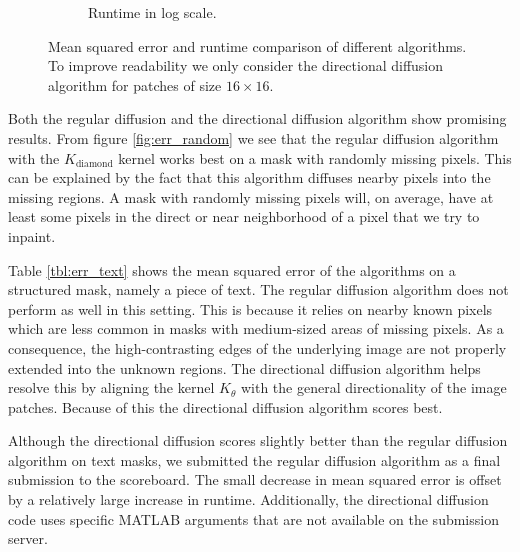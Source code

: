 \begin{figure}
\begin{subfigure}[b]{0.49\textwidth}
		\caption{Runtime in log scale.}
		\label{fig:runtime}
	\end{subfigure}
	
	\caption{Mean squared error and runtime comparison of different algorithms. To improve readability we only consider the directional diffusion algorithm for patches of size $16 \times 16$.}
	\label{fig:rmd_results}
\end{figure}


Both the regular diffusion and the directional diffusion algorithm show promising results. From figure \ref{fig:err_random} we see that the regular diffusion algorithm with the $K_{\text{diamond}}$ kernel works best on a mask with randomly missing pixels. This can be explained by the fact that this algorithm diffuses nearby pixels into the missing regions. A mask with randomly missing pixels will, on average, have at least some pixels in the direct or near neighborhood of a pixel that we try to inpaint.

Table \ref{tbl:err_text} shows the mean squared error of the algorithms on a structured mask, namely a piece of text. The regular diffusion algorithm does not perform as well in this setting. This is because it relies on nearby known pixels which are less common in masks with medium-sized areas of missing pixels. As a consequence, the high-contrasting edges of the underlying image are not properly extended into the unknown regions. The directional diffusion algorithm helps resolve this by aligning the kernel  $K_{\theta}$ with the general directionality of the image patches. Because of this the directional diffusion algorithm scores best.

Although the directional diffusion scores slightly better than the regular diffusion algorithm on text masks, we submitted the regular diffusion algorithm as a final submission to the scoreboard. The small decrease in mean squared error is offset by a relatively large increase in runtime. Additionally, the directional diffusion code uses specific MATLAB arguments that are not available on the submission server.